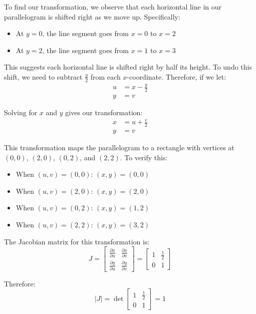 \begin{example}
\begin{solution}
\noindent To find our transformation, we observe that each horizontal line in our parallelogram is shifted right as we move up. Specifically:
\begin{itemize}
    \item At $y = 0$, the line segment goes from $x = 0$ to $x = 2$
    \item At $y = 2$, the line segment goes from $x = 1$ to $x = 3$
\end{itemize}

\noindent This suggests each horizontal line is shifted right by half its height. To undo this shift, we need to subtract $\frac{y}{2}$ from each $x$-coordinate. Therefore, if we let:
\begin{align*}
u &= x - \frac{y}{2} \\
y &= v
\end{align*}

\noindent Solving for $x$ and $y$ gives our transformation:
\begin{align*}
x &= u + \frac{v}{2} \\
y &= v
\end{align*}

\noindent This transformation maps the parallelogram to a rectangle with vertices at $(0,0)$, $(2,0)$, $(0,2)$, and $(2,2)$. To verify this:
\begin{itemize}
    \item When $(u,v) = (0,0)$: $(x,y) = (0,0)$
    \item When $(u,v) = (2,0)$: $(x,y) = (2,0)$
    \item When $(u,v) = (0,2)$: $(x,y) = (1,2)$
    \item When $(u,v) = (2,2)$: $(x,y) = (3,2)$
\end{itemize}

\noindent The Jacobian matrix for this transformation is:
\[
J = \begin{bmatrix}
\frac{\partial x}{\partial u} & \frac{\partial x}{\partial v} \\[1ex]
\frac{\partial y}{\partial u} & \frac{\partial y}{\partial v}
\end{bmatrix} = \begin{bmatrix}
1 & \frac{1}{2} \\
0 & 1
\end{bmatrix}
\]

\noindent Therefore:
\[
|J| = \det\begin{bmatrix}
1 & \frac{1}{2} \\
0 & 1
\end{bmatrix} = 1
\]


\end{solution}
\end{example}
